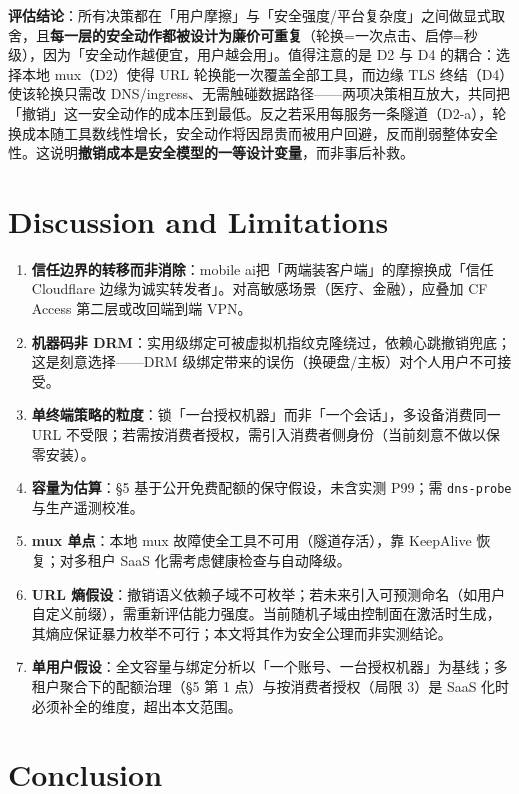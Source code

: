 \documentclass[10pt,a4paper]{article}
\newcommand{\sys}{mobile ai}
\begin{document}
\noindent\textbf{评估结论}：所有决策都在「用户摩擦」与「安全强度/平台复杂度」之间做显式取舍，且\textbf{每一层的安全动作都被设计为廉价可重复}（轮换=一次点击、启停=秒级），因为「安全动作越便宜，用户越会用」。值得注意的是 D2 与 D4 的耦合：选择本地 mux（D2）使得 URL 轮换能一次覆盖全部工具，而边缘 TLS 终结（D4）使该轮换只需改 DNS/ingress、无需触碰数据路径——两项决策相互放大，共同把「撤销」这一安全动作的成本压到最低。反之若采用每服务一条隧道（D2-a），轮换成本随工具数线性增长，安全动作将因昂贵而被用户回避，反而削弱整体安全性。这说明\textbf{撤销成本是安全模型的一等设计变量}，而非事后补救。

\section{Discussion and Limitations}

\begin{enumerate}[leftmargin=1.6em,itemsep=0.35em,topsep=0.4em]
  \item \textbf{信任边界的转移而非消除}：\sys 把「两端装客户端」的摩擦换成「信任 Cloudflare 边缘为诚实转发者」。对高敏感场景（医疗、金融），应叠加 CF Access 第二层或改回端到端 VPN。
  \item \textbf{机器码非 DRM}：实用级绑定可被虚拟机指纹克隆绕过，依赖心跳撤销兜底；这是刻意选择——DRM 级绑定带来的误伤（换硬盘/主板）对个人用户不可接受。
  \item \textbf{单终端策略的粒度}：锁「一台授权机器」而非「一个会话」，多设备消费同一 URL 不受限；若需按消费者授权，需引入消费者侧身份（当前刻意不做以保零安装）。
  \item \textbf{容量为估算}：§5 基于公开免费配额的保守假设，未含实测 P99；需 \texttt{dns-probe} 与生产遥测校准。
  \item \textbf{mux 单点}：本地 mux 故障使全工具不可用（隧道存活），靠 KeepAlive 恢复；对多租户 SaaS 化需考虑健康检查与自动降级。
  \item \textbf{URL 熵假设}：撤销语义依赖子域不可枚举；若未来引入可预测命名（如用户自定义前缀），需重新评估能力强度。当前随机子域由控制面在激活时生成，其熵应保证暴力枚举不可行；本文将其作为安全公理而非实测结论。
  \item \textbf{单用户假设}：全文容量与绑定分析以「一个账号、一台授权机器」为基线；多租户聚合下的配额治理（§5 第 1 点）与按消费者授权（局限 3）是 SaaS 化时必须补全的维度，超出本文范围。
\end{enumerate}

\section{Conclusion}
\end{document}
